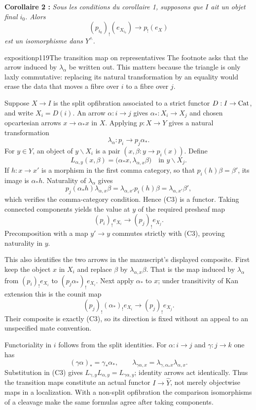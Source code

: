 \textbf{Corollaire 2 :} \textit{Sous les conditions du corollaire 1, supposons que $I$ ait un objet final $i_0$. Alors}
\[
(p_{i_0})_!(e_{X_{i_0}}) \longrightarrow p_!(e_X)
\]
\textit{est un isomorphisme dans $Y^\wedge$.}

\begin{dcomment}{exposition}{p119}{The transition map on representatives}
The footnote asks that the arrow induced by $\lambda_\alpha$ be written out. This matters because the triangle is only laxly commutative: replacing its natural transformation by an equality would erase the data that moves a fibre over $i$ to a fibre over $j$.

Suppose $X\to I$ is the split opfibration associated to a strict functor $D:I\to\mathrm{Cat}$, and write $X_i=D(i)$. An arrow $\alpha:i\to j$ gives $\alpha_*:X_i\to X_j$ and chosen opcartesian arrows $x\to\alpha_*x$ in $X$. Applying $p:X\to Y$ gives a natural transformation
\[
 \lambda_\alpha:p_i\longrightarrow p_j\alpha_*.
\]
For $y\in Y$, an object of $y\backslash X_i$ is a pair $(x,\beta:y\to p_i(x))$. Define
\[
 L_{\alpha,y}(x,\beta)
   =\bigl(\alpha_*x,\lambda_{\alpha,x}\beta\bigr)
     \quad\text{in }y\backslash X_j.                 \tag{C3}
\]
If $h:x\to x'$ is a morphism in the first comma category, so that $p_i(h)\beta=\beta'$, its image is $\alpha_*h$. Naturality of $\lambda_\alpha$ gives
\[
 p_j(\alpha_*h)\lambda_{\alpha,x}\beta
 =\lambda_{\alpha,x'}p_i(h)\beta
 =\lambda_{\alpha,x'}\beta',
\]
which verifies the comma-category condition. Hence (C3) is a functor. Taking connected components yields the value at $y$ of the required presheaf map
\[
 (p_i)_!e_{X_i}\longrightarrow(p_j)_!e_{X_j}.
\]
Precomposition with a map $y'\to y$ commutes strictly with (C3), proving naturality in $y$.

This also identifies the two arrows in the manuscript's displayed composite. First keep the object $x$ in $X_i$ and replace $\beta$ by $\lambda_{\alpha,x}\beta$. That is the map induced by $\lambda_\alpha$ from $(p_i)_!e_{X_i}$ to $(p_j\alpha_*)_!e_{X_i}$. Next apply $\alpha_*$ to $x$; under transitivity of Kan extension this is the counit map
\[
 (p_j)_!(\alpha_*)_!e_{X_i}\longrightarrow(p_j)_!e_{X_j}.
\]
Their composite is exactly (C3), so its direction is fixed without an appeal to an unspecified mate convention.

Functoriality in $i$ follows from the split identities. For $\alpha:i\to j$ and $\gamma:j\to k$ one has
\[
 (\gamma\alpha)_*=\gamma_*\alpha_*,
 \qquad
 \lambda_{\gamma\alpha,x}
 =\lambda_{\gamma,\alpha_*x}\lambda_{\alpha,x}.
\]
Substitution in (C3) gives $L_{\gamma,y}L_{\alpha,y}=L_{\gamma\alpha,y}$; identity arrows act identically. Thus the transition maps constitute an actual functor $I\to\widehat Y$, not merely objectwise maps in a localization. With a non-split opfibration the comparison isomorphisms of a cleavage make the same formulas agree after taking components.


\end{dcomment}
